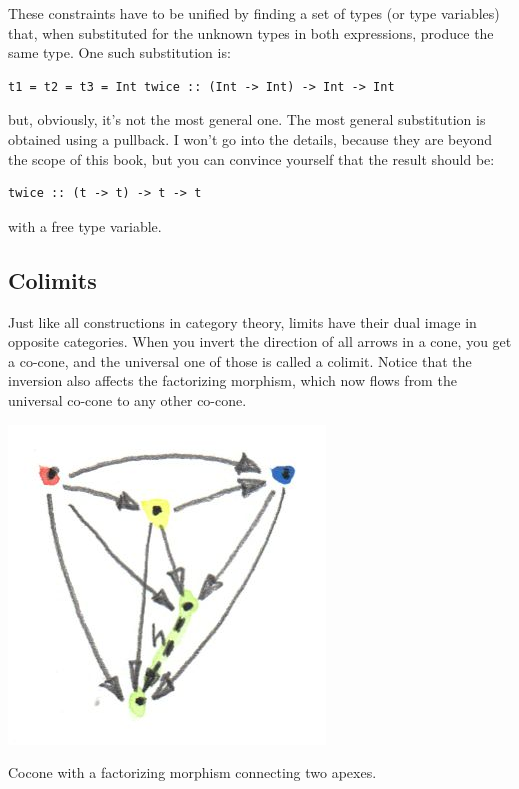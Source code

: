 These constraints have to be unified by finding a set of types (or type
variables) that, when substituted for the unknown types in both
expressions, produce the same type. One such substitution is:

\begin{verbatim}
t1 = t2 = t3 = Int twice :: (Int -> Int) -> Int -> Int
\end{verbatim}

but, obviously, it's not the most general one. The most general
substitution is obtained using a pullback. I won't go into the details,
because they are beyond the scope of this book, but you can convince
yourself that the result should be:

\begin{verbatim}
twice :: (t -> t) -> t -> t
\end{verbatim}

with  a free type variable.

\subsection{Colimits}\label{colimits}

Just like all constructions in category theory, limits have their dual
image in opposite categories. When you invert the direction of all
arrows in a cone, you get a co-cone, and the universal one of those is
called a colimit. Notice that the inversion also affects the factorizing
morphism, which now flows from the universal co-cone to any other
co-cone.

\hypertarget{attachment_4494}{}
\includegraphics{images/colimit.jpg}

Cocone with a factorizing morphism  connecting two apexes.

